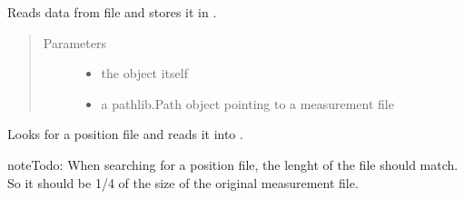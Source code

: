 \documentclass[letterpaper,10pt,english]{sphinxmanual}
\begin{document}
\begin{fulllineitems}
\begin{fulllineitems}
\end{fulllineitems}


\begin{fulllineitems}
\label{\detokenize{measurement:measurement.Measurement.read_data}}
Reads data from file and stores it in .
\begin{quote}\begin{description}
\item[{Parameters}] \leavevmode\begin{itemize}
\item {} 
 \textendash{} the object itself

\item {} 
 \textendash{} a pathlib.Path object pointing to a measurement file

\end{itemize}

\end{description}\end{quote}

\end{fulllineitems}


\begin{fulllineitems}
\label{\detokenize{measurement:measurement.Measurement.read_pos_file}}
Looks for a position file and reads it into .

\begin{sphinxadmonition}{note}{\label{measurement:index-6}Todo:}
When searching for a position file, the lenght of the file should match. So it should be 1/4 of the size of the original measurement file.
\end{sphinxadmonition}

\end{fulllineitems}



\end{fulllineitems}
\end{document}
